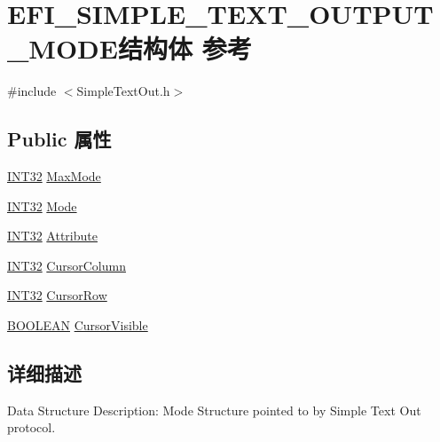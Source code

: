 \hypertarget{struct_e_f_i___s_i_m_p_l_e___t_e_x_t___o_u_t_p_u_t___m_o_d_e}{}\section{E\+F\+I\+\_\+\+S\+I\+M\+P\+L\+E\+\_\+\+T\+E\+X\+T\+\_\+\+O\+U\+T\+P\+U\+T\+\_\+\+M\+O\+D\+E结构体 参考}
\label{struct_e_f_i___s_i_m_p_l_e___t_e_x_t___o_u_t_p_u_t___m_o_d_e}


{\ttfamily \#include $<$Simple\+Text\+Out.\+h$>$}

\subsection*{Public 属性}
\begin{DoxyCompactItemize}
\item 
\hyperlink{_processor_bind_8h_a1137216524060afd426c34677fed058b}{I\+N\+T32} \hyperlink{struct_e_f_i___s_i_m_p_l_e___t_e_x_t___o_u_t_p_u_t___m_o_d_e_a3dedfd2b5207b5380b8fad45c4386374}{Max\+Mode}
\item 
\hyperlink{_processor_bind_8h_a1137216524060afd426c34677fed058b}{I\+N\+T32} \hyperlink{struct_e_f_i___s_i_m_p_l_e___t_e_x_t___o_u_t_p_u_t___m_o_d_e_a0b7bba5e8c701dc2047c1470553deaad}{Mode}
\item 
\hyperlink{_processor_bind_8h_a1137216524060afd426c34677fed058b}{I\+N\+T32} \hyperlink{struct_e_f_i___s_i_m_p_l_e___t_e_x_t___o_u_t_p_u_t___m_o_d_e_a0136391bb45c36249b46bad59ba4d55d}{Attribute}
\item 
\hyperlink{_processor_bind_8h_a1137216524060afd426c34677fed058b}{I\+N\+T32} \hyperlink{struct_e_f_i___s_i_m_p_l_e___t_e_x_t___o_u_t_p_u_t___m_o_d_e_a1c9c7f500e028c2f91636ba81d6eff30}{Cursor\+Column}
\item 
\hyperlink{_processor_bind_8h_a1137216524060afd426c34677fed058b}{I\+N\+T32} \hyperlink{struct_e_f_i___s_i_m_p_l_e___t_e_x_t___o_u_t_p_u_t___m_o_d_e_a0009c3bfeea40340a57d7a70974adbde}{Cursor\+Row}
\item 
\hyperlink{_processor_bind_8h_a112e3146cb38b6ee95e64d85842e380a}{B\+O\+O\+L\+E\+AN} \hyperlink{struct_e_f_i___s_i_m_p_l_e___t_e_x_t___o_u_t_p_u_t___m_o_d_e_a055988007b0c1489cdc84aef06bdfc78}{Cursor\+Visible}
\end{DoxyCompactItemize}


\subsection{详细描述}
\begin{DoxyParagraph}{Data Structure Description\+:}
Mode Structure pointed to by Simple Text Out protocol. 
\end{DoxyParagraph}


